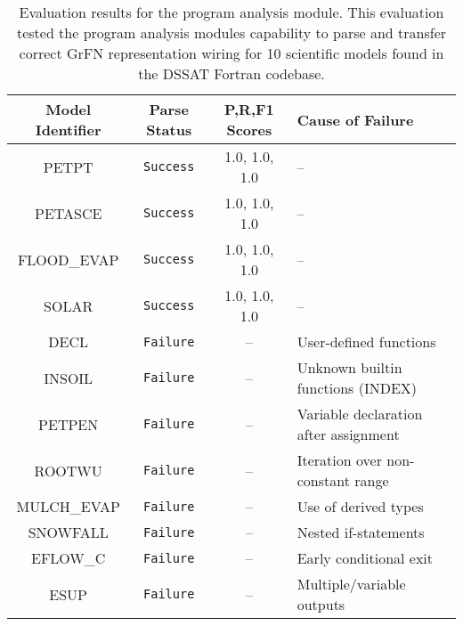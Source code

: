 \begin{center}
  \begin{table}
    \centering
    \label{tab:pa_eval_table}
    \begin{tabular}{ |c|c|c|l| }
     \hline
     \textbf{Model Identifier} & \textbf{Parse Status} & \textbf{P,R,F1 Scores} & \textbf{Cause of Failure} \\
     \hline
     PETPT & \texttt{Success} & 1.0, 1.0, 1.0 & -- \\
     PETASCE & \texttt{Success} & 1.0, 1.0, 1.0 & -- \\
     \hline
     FLOOD\_EVAP & \texttt{Success} & 1.0, 1.0, 1.0 & -- \\
     SOLAR & \texttt{Success} & 1.0, 1.0, 1.0 & -- \\
     DECL & \texttt{Failure} & -- & User-defined functions \\
     INSOIL & \texttt{Failure} & -- & Unknown builtin functions (INDEX) \\
     PETPEN & \texttt{Failure} & -- & Variable declaration after assignment \\
     ROOTWU & \texttt{Failure} & -- & Iteration over non-constant range \\
     MULCH\_EVAP & \texttt{Failure} & -- & Use of derived types \\
     SNOWFALL & \texttt{Failure} & -- & Nested if-statements \\
     EFLOW\_C & \texttt{Failure} & -- & Early conditional exit \\
     ESUP & \texttt{Failure} & -- & Multiple/variable outputs \\
     \hline
    \end{tabular}
    \caption[Program Analysis Module Evaluation]{Evaluation results for the program analysis module. This evaluation tested the program analysis modules capability to parse and transfer correct GrFN representation wiring for 10 scientific models found in the DSSAT Fortran codebase.}
  \end{table}
\end{center}


